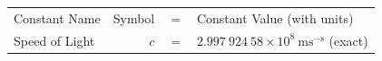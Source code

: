 \begin{tabular}{lrcl}
	 Constant Name & Symbol & = & Constant Value (with units) \\
	Speed of Light & $c$ & $=$ & $2.997\ 924\ 58\times10^{8}\ \mbox{ms}^{-\mbox{s}}$ (exact)\\

\end{tabular}
\clearpage
